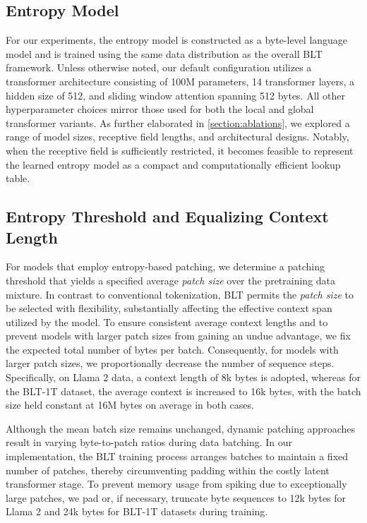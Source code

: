 \subsection{Entropy Model} For our experiments, the entropy model is constructed as a byte-level language model and is trained using the same data distribution as the overall {\textsc BLT} framework. Unless otherwise noted, our default configuration utilizes a transformer architecture consisting of 100M parameters, 14 transformer layers, a hidden size of 512, and sliding window attention spanning 512 bytes. All other hyperparameter choices mirror those used for both the local and global transformer variants. As further elaborated in \autoref{section:ablations}, we explored a range of model sizes, receptive field lengths, and architectural designs. Notably, when the receptive field is sufficiently restricted, it becomes feasible to represent the learned entropy model as a compact and computationally efficient lookup table.

\subsection{Entropy Threshold and Equalizing Context Length} For models that employ entropy-based patching, we determine a patching threshold that yields a specified average \textit{patch size} over the pretraining data mixture. In contrast to conventional tokenization, {\textsc BLT} permits the \textit{patch size} to be selected with flexibility, substantially affecting the effective context span utilized by the model. To ensure consistent average context lengths and to prevent models with larger patch sizes from gaining an undue advantage, we fix the expected total number of bytes per batch. Consequently, for models with larger patch sizes, we proportionally decrease the number of sequence steps. Specifically, on Llama 2 data, a context length of 8k bytes is adopted, whereas for the {\textsc BLT}-1T dataset, the average context is increased to 16k bytes, with the batch size held constant at 16M bytes on average in both cases.

Although the mean batch size remains unchanged, dynamic patching approaches result in varying byte-to-patch ratios during data batching. In our implementation, the {\textsc BLT} training process arranges batches to maintain a fixed number of patches, thereby circumventing padding within the costly latent transformer stage. To prevent memory usage from spiking due to exceptionally large patches, we pad or, if necessary, truncate byte sequences to 12k bytes for Llama 2 and 24k bytes for {\textsc BLT}-1T datasets during training.

